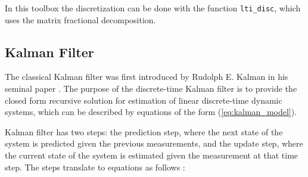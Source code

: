 In this toolbox the discretization can be done with the function
\texttt{lti\_disc}, which uses the
matrix fractional decomposition.

%
\subsection{Kalman Filter}
%

The classical Kalman filter was first introduced by Rudolph E. Kalman in his
seminal paper \citep{Kalman:1960}. The purpose of the discrete-time Kalman filter
is to provide the closed form recursive solution for estimation of linear discrete-time dynamic
systems, which can be described by equations of the form (\ref{eq:kalman_model}).

Kalman filter has two steps: the prediction step, where the next state of the
system is predicted given the previous measurements, and the update step, where
the current state of the system is estimated  given the measurement at that time
step. The steps translate to equations as follows \citep[see, e.g.,][for derivation]{Sarkka+Vehtari+Lampinen:2007,Bar-Shalom+Li+Kirubarajan:2001}:

